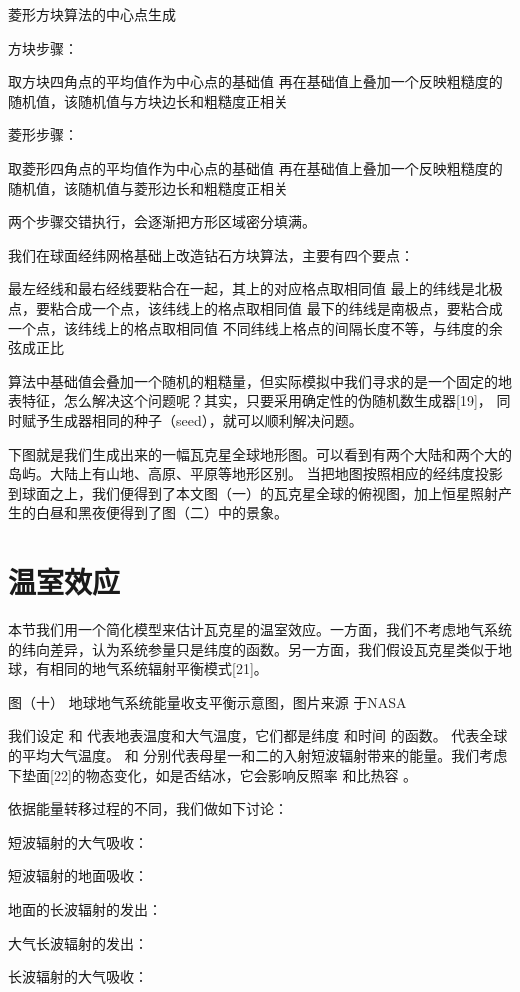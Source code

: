 \documentclass[a4paper,10.5pt]{book}
\begin{document}
菱形方块算法的中心点生成

方块步骤：

取方块四角点的平均值作为中心点的基础值
再在基础值上叠加一个反映粗糙度的随机值，该随机值与方块边长和粗糙度正相关

菱形步骤：

取菱形四角点的平均值作为中心点的基础值
再在基础值上叠加一个反映粗糙度的随机值，该随机值与菱形边长和粗糙度正相关

两个步骤交错执行，会逐渐把方形区域密分填满。

我们在球面经纬网格基础上改造钻石方块算法，主要有四个要点：

最左经线和最右经线要粘合在一起，其上的对应格点取相同值
最上的纬线是北极点，要粘合成一个点，该纬线上的格点取相同值
最下的纬线是南极点，要粘合成一个点，该纬线上的格点取相同值
不同纬线上格点的间隔长度不等，与纬度的余弦成正比

算法中基础值会叠加一个随机的粗糙量，但实际模拟中我们寻求的是一个固定的地表特征，怎么解决这个问题呢？其实，只要采用确定性的伪随机数生成器[19]，
同时赋予生成器相同的种子（seed），就可以顺利解决问题。

下图就是我们生成出来的一幅瓦克星全球地形图。可以看到有两个大陆和两个大的岛屿。大陆上有山地、高原、平原等地形区别。
当把地图按照相应的经纬度投影到球面之上，我们便得到了本文图（一）的瓦克星全球的俯视图，加上恒星照射产生的白昼和黑夜便得到了图（二）中的景象。

\section{温室效应}

本节我们用一个简化模型来估计瓦克星的温室效应。一方面，我们不考虑地气系统的纬向差异，认为系统参量只是纬度的函数。另一方面，我们假设瓦克星类似于地球，有相同的地气系统辐射平衡模式[21]。


图（十）
地球地气系统能量收支平衡示意图，图片来源 于NASA

我们设定  和  代表地表温度和大气温度，它们都是纬度  和时间  的函数。   代表全球的平均大气温度。 和   分别代表母星一和二的入射短波辐射带来的能量。我们考虑下垫面[22]的物态变化，如是否结冰，它会影响反照率  和比热容  。

依据能量转移过程的不同，我们做如下讨论：

短波辐射的大气吸收：

短波辐射的地面吸收：

地面的长波辐射的发出：

大气长波辐射的发出：

长波辐射的大气吸收：
\end{document}
